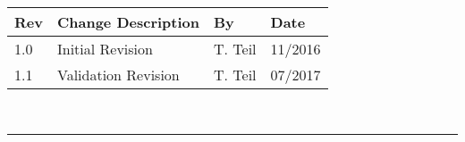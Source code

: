 \documentclass[]{BasiliskReportMemo}
\begin{document}
\makeCover

%
%
\pagestyle{empty}
{\renewcommand{\arraystretch}{2}
\noindent
\begin{longtable}{|p{0.5in}|p{3.5in}|p{1.07in}|p{0.9in}|}
\hline
{\bfseries Rev} & {\bfseries Change Description} & {\bfseries By}& {\bfseries Date} \\
\hline
1.0 & Initial Revision & T. Teil & 11/2016\\
\hline
1.1 & Validation Revision& T. Teil & 07/2017\\
\hline

\end{longtable}
}



\newpage
\setcounter{page}{1}
\pagestyle{fancy}

\tableofcontents %
~\\ \hrule ~\\ %










	



\end{document}

